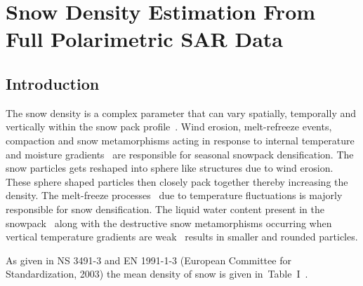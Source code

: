 \chapter{Snow Density Estimation From Full Polarimetric SAR Data}
\section{Introduction}
\label{S:1}

The snow density is a complex parameter that can vary spatially, temporally and vertically within the snow pack profile~\citep{bormann2013spatial}. Wind erosion, melt-refreeze events, compaction and snow metamorphisms acting in response to internal temperature and moisture gradients~\citep{sommerfeld1970classification,colbeck1982overview} are responsible for seasonal snowpack densification. The snow particles gets reshaped into sphere like structures due to wind erosion. These sphere shaped particles then closely pack together thereby increasing the density. The melt-freeze processes~\citep{colbeck1982overview} due to temperature fluctuations is majorly responsible for snow densification. The liquid water content present in the snowpack~\citep{brun1989energy,marshall1999snow} along with the destructive snow metamorphisms occurring when vertical temperature gradients are weak~\citep{colbeck1982overview} results in smaller and rounded particles. 

As given in NS 3491-3 and EN 1991-1-3 (European Committee for Standardization, 2003) the mean density of snow is given in~Table~I~\citep{MET40}. 

